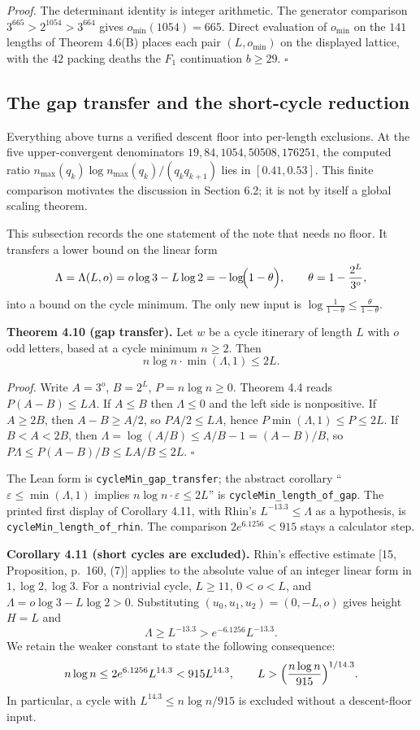 \documentclass[12pt]{article}
\begin{document}
\emph{Proof.} The determinant identity is integer arithmetic. The
generator comparison \(3^{665}>2^{1054}>3^{664}\) gives
\(o_{\min}(1054)=665\). Direct evaluation of \(o_{\min}\) on the \(141\)
lengths of Theorem 4.6(B) places each pair \((L,o_{\min})\) on the
displayed lattice, with the \(42\) packing deaths the \(F_1\)
continuation \(b\ge 29\). \(\square\)

\subsection{The gap transfer and the short-cycle
reduction}\label{the-gap-transfer-and-the-short-cycle-reduction}

Everything above turns a verified descent floor into per-length
exclusions. At the five upper-convergent denominators
\(19,84,1054,50508,176251\), the computed ratio
\(n_{\max}(q_k)\log n_{\max}(q_k)/(q_kq_{k+1})\) lies in
\([0.41,0.53]\). This finite comparison motivates the discussion in
Section 6.2; it is not by itself a global scaling theorem.

This subsection records the one statement of the note that needs no
floor. It transfers a lower bound on the linear form \[
\Lambda=\Lambda(L,o)=o\log 3-L\log 2=-\log\!\Bigl(1-\theta\Bigr),
\qquad \theta=1-\frac{2^L}{3^o},
\] into a bound on the cycle minimum. The only new input is
\(\log\frac1{1-\theta}\le\frac{\theta}{1-\theta}\).

\textbf{Theorem 4.10 (gap transfer).} Let \(w\) be a cycle itinerary of
length \(L\) with \(o\) odd letters, based at a cycle minimum
\(n\ge 2\). Then \[
n\log n\cdot\min(\Lambda,1)\le 2L.
\]

\emph{Proof.} Write \(A=3^o\), \(B=2^L\), \(P=n\log n\ge 0\). Theorem
4.4 reads \(P(A-B)\le LA\). If \(A\le B\) then \(\Lambda\le 0\) and the
left side is nonpositive. If \(A\ge 2B\), then \(A-B\ge A/2\), so
\(PA/2\le LA\), hence \(P\min(\Lambda,1)\le P\le 2L\). If \(B<A<2B\),
then \(\Lambda=\log(A/B)\le A/B-1=(A-B)/B\), so
\(P\Lambda\le P(A-B)/B\le LA/B\le 2L\). \(\square\)

The Lean form is \texttt{\nolinkurl{cycleMin_gap_transfer}}; the
abstract corollary ``\(\varepsilon\le\min(\Lambda,1)\) implies
\(n\log n\cdot\varepsilon\le 2L\)'' is
\texttt{\nolinkurl{cycleMin_length_of_gap}}. The printed first display
of Corollary 4.11, with Rhin's \(L^{-13.3}\le\Lambda\) as a hypothesis,
is \texttt{\nolinkurl{cycleMin_length_of_rhin}}. The comparison
\(2e^{6.1256}<915\) stays a calculator step.

\textbf{Corollary 4.11 (short cycles are excluded).} Rhin's effective
estimate {[}15, Proposition, p.~160, (7){]} applies to the absolute
value of an integer linear form in \(1,\log2,\log3\). For a nontrivial
cycle, \(L\ge11\), \(0<o<L\), and \(\Lambda=o\log3-L\log2>0\).
Substituting \((u_0,u_1,u_2)=(0,-L,o)\) gives height \(H=L\) and \[
\Lambda\ge L^{-13.3}>e^{-6.1256}L^{-13.3}.
\] We retain the weaker constant to state the following consequence: \[
n\log n\le2e^{6.1256}L^{14.3}<915L^{14.3},
\qquad
L>\Bigl(\frac{n\log n}{915}\Bigr)^{1/14.3}.
\] In particular, a cycle with \(L^{14.3}\le n\log n/915\) is excluded
without a descent-floor input.
\end{document}
